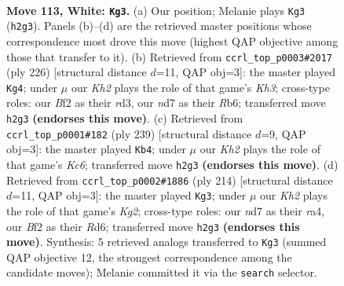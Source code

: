 \documentclass[11pt]{article}
\begin{document}
\clearpage

\begin{figure}[p]\centering
\begin{subfigure}{0.46\textwidth}\centering
\resizebox{\linewidth}{!}{%
\newchessgame
\chessboard[
  setfen={7k/3n4/8/5P2/p7/P6P/5B1K/8 w - - 45 113},
  showmover=false,
  pgfstyle=straightmove, color=movearrow, markmove={h2-g3}
]}
\caption{}
\end{subfigure}\hfill
\begin{subfigure}{0.46\textwidth}\centering
\resizebox{\linewidth}{!}{%
\newchessgame
\chessboard[
  setfen={8/5k2/1R6/4p3/8/3r1PPK/8/8 w - - 39 114},
  showmover=false,
  pgfstyle=straightmove, color=movearrow, markmove={h3-g4}
]}
\caption{}
\end{subfigure}
\\[4pt]
\begin{subfigure}{0.46\textwidth}\centering
\resizebox{\linewidth}{!}{%
\newchessgame
\chessboard[
  setfen={8/8/7K/p7/P7/2k5/Bp6/8 b - - 1 120},
  showmover=false,
  pgfstyle=straightmove, color=movearrow, markmove={c3-b4}
]}
\caption{}
\end{subfigure}\hfill
\begin{subfigure}{0.46\textwidth}\centering
\resizebox{\linewidth}{!}{%
\newchessgame
\chessboard[
  setfen={8/6k1/3R4/6p1/r5P1/8/5PK1/8 w - - 45 108},
  showmover=false,
  pgfstyle=straightmove, color=movearrow, markmove={g2-g3}
]}
\caption{}
\end{subfigure}
\caption{\textbf{Move 113, White: \texttt{Kg3}.} (a) Our position; Melanie plays \texttt{Kg3} (\texttt{h2g3}). Panels (b)--(d) are the retrieved master positions whose correspondence most drove this move (highest QAP objective among those that transfer to it). (b) Retrieved from \texttt{ccrl\_top\_p0003\#2017} (ply 226) [structural distance $d$=11, QAP obj=3]: the master played \texttt{Kg4}; under $\mu$ our \emph{Kh2} plays the role of that game's \emph{Kh3}; cross-type roles: our \emph{B}f2 as their \emph{r}d3, our \emph{n}d7 as their \emph{R}b6; transferred move \texttt{h2g3} \textbf{(endorses this move)}. (c) Retrieved from \texttt{ccrl\_top\_p0001\#182} (ply 239) [structural distance $d$=9, QAP obj=3]: the master played \texttt{Kb4}; under $\mu$ our \emph{Kh2} plays the role of that game's \emph{Kc6}; transferred move \texttt{h2g3} \textbf{(endorses this move)}. (d) Retrieved from \texttt{ccrl\_top\_p0002\#1886} (ply 214) [structural distance $d$=11, QAP obj=3]: the master played \texttt{Kg3}; under $\mu$ our \emph{Kh2} plays the role of that game's \emph{Kg2}; cross-type roles: our \emph{n}d7 as their \emph{r}a4, our \emph{B}f2 as their \emph{R}d6; transferred move \texttt{h2g3} \textbf{(endorses this move)}. Synthesis: 5 retrieved analogs transferred to \texttt{Kg3} (summed QAP objective 12, the strongest correspondence among the candidate moves); Melanie committed it via the \texttt{search} selector.}
\label{fig:thought-m224}
\end{figure}
\end{document}
